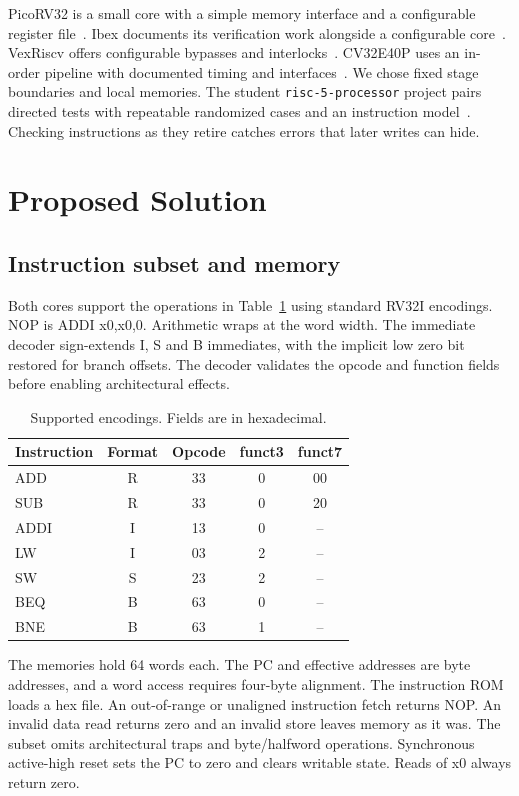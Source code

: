 \documentclass[conference]{IEEEtran}
\begin{document}
PicoRV32 is a small core with a simple memory interface and a configurable register file~\cite{pico}. Ibex documents its verification work alongside a configurable core~\cite{ibex}. VexRiscv offers configurable bypasses and interlocks~\cite{vex}. CV32E40P uses an in-order pipeline with documented timing and interfaces~\cite{cv}. We chose fixed stage boundaries and local memories. The student \texttt{risc-5-processor} project pairs directed tests with repeatable randomized cases and an instruction model~\cite{comparison}. Checking instructions as they retire catches errors that later writes can hide.

\section{Proposed Solution}
\subsection{Instruction subset and memory}
Both cores support the operations in Table~\ref{tab:enc} using standard RV32I encodings. NOP is ADDI x0,x0,0. Arithmetic wraps at the word width. The immediate decoder sign-extends I, S and B immediates, with the implicit low zero bit restored for branch offsets. The decoder validates the opcode and function fields before enabling architectural effects.

\begin{table}[t]
\caption{Supported encodings. Fields are in hexadecimal.}
\label{tab:enc}
\centering
\begin{tabular}{lcccc}\hline
Instruction & Format & Opcode & funct3 & funct7\\\hline
ADD  & R & 33 & 0 & 00\\
SUB  & R & 33 & 0 & 20\\
ADDI & I & 13 & 0 & --\\
LW   & I & 03 & 2 & --\\
SW   & S & 23 & 2 & --\\
BEQ  & B & 63 & 0 & --\\
BNE  & B & 63 & 1 & --\\\hline
\end{tabular}
\end{table}

The memories hold 64 words each. The PC and effective addresses are byte addresses, and a word access requires four-byte alignment. The instruction ROM loads a hex file. An out-of-range or unaligned instruction fetch returns NOP. An invalid data read returns zero and an invalid store leaves memory as it was. The subset omits architectural traps and byte/halfword operations. Synchronous active-high reset sets the PC to zero and clears writable state. Reads of x0 always return zero.
\end{document}
